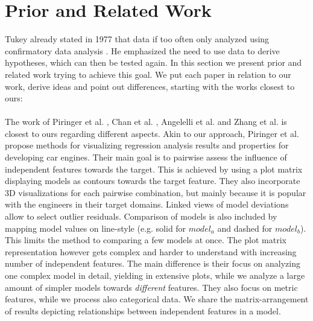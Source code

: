 \documentclass[journal]{style/vgtc} 			          %
\begin{document}
\section{Prior and Related Work}
Tukey already stated in 1977 that data if too often only analyzed using confirmatory data analysis \cite{Tukey}.
He emphasized the need to use data to derive hypotheses, which can then be tested again.
In this section we present prior and related work trying to achieve this goal.
We put each paper in relation to our work, derive ideas and point out differences, starting with the works closest to ours:
\\\\
The work of Piringer et al. \cite{Piringer}, Chan et al. \cite{Chan}, Angelelli et al. \cite{Angelelli} and Zhang et al. \cite{Zhang2014} is closest to ours regarding different aspects.
Akin to our approach, Piringer et al. \cite{Piringer} propose methods for visualizing regression analysis results and properties for developing car engines.
Their main goal is to pairwise assess the influence of independent features towards the target.
This is achieved by using a plot matrix displaying models as contours towards the target feature.
They also incorporate 3D visualizations for each pairwise combination, but mainly because it is popular with the engineers in their target domains.
Linked views of model deviations allow to select outlier residuals.
Comparison of models is also included by mapping model values on line-style (e.g. solid for $model_a$ and dashed for $model_b$).
This limits the method to comparing a few models at once.
The plot matrix representation however gets complex and harder to understand with increasing number of independent features.
The main difference is their focus on analyzing one complex model in detail, yielding in extensive plots, while we analyze a large amount of simpler models towards \emph{different} features.
They also focus on metric features, while we process also categorical data.
We share the matrix-arrangement of results depicting relationships between independent features in a model.
\end{document}
